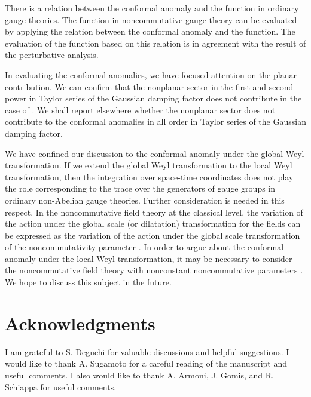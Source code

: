 \documentclass[a4paper,12pt]{article}
\begin{document}
There is a relation between the conformal anomaly and the \myHighlight{$\beta$}\coordHE{} function 
in ordinary gauge theories. The \myHighlight{$\beta$}\coordHE{} function in noncommutative gauge 
theory can be evaluated by applying the relation between the conformal anomaly 
and the \myHighlight{$\beta$}\coordHE{} function. The evaluation of the \myHighlight{$\beta$}\coordHE{} function based on this 
relation is in agreement with the result of the perturbative analysis. 

In evaluating the conformal anomalies, we have focused attention on the 
planar contribution. We can confirm that the nonplanar sector in the first 
and second power in Taylor series of the Gaussian damping factor does not 
contribute in the case of 
\coordHE{}. 
We shall report elsewhere whether the nonplanar sector does not 
contribute to the conformal anomalies in all order in Taylor series of the 
Gaussian damping factor. 


We have confined our discussion to the conformal anomaly under the global 
Weyl transformation. If we extend the global Weyl transformation to the local 
Weyl transformation, then the integration over space-time coordinates does not 
play the role corresponding to the trace over the generators of gauge groups 
in ordinary non-Abelian gauge theories. 
Further consideration is needed in this respect. 
In the noncommutative field theory at the classical level, the 
variation of the action under the global scale (or dilatation) transformation 
for the fields can be expressed as the variation of the action under the 
global scale transformation of the noncommutativity 
parameter \cite{AGJGHGLPMSRW}. 
In order to argue about the conformal anomaly under the local Weyl 
transformation, it may be necessary to consider the noncommutative field 
theory with nonconstant noncommutative parameters \cite{PMHSPM}. 
We hope to discuss this subject in the future. 









\section*{Acknowledgments}

I am grateful to S. Deguchi for valuable discussions and helpful suggestions. 
I would like to thank A. Sugamoto for a careful reading of the manuscript 
and useful comments. I also would like to thank A. Armoni, J. Gomis, and 
R. Schiappa for useful comments. 
\end{document}
